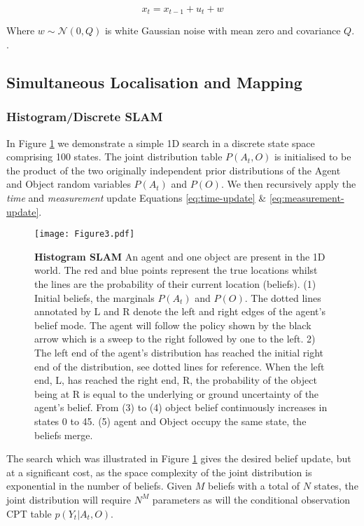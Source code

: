 \documentclass[review]{elsarticle}
\numberwithin{equation}{section}
\begin{document}
\begin{equation} \label{eq:dynamical_model}
  x_{t} = x_{t-1} + u_{t} + w \nonumber
\end{equation}

Where $w \sim \mathcal{N}(0,Q)$ is white Gaussian noise with mean zero and covariance $Q$. .

\subsection{Simultaneous Localisation and Mapping}

\subsubsection{Histogram/Discrete SLAM}\label{sec:Discrete}

In Figure \ref{fig:discrete_example} we demonstrate a simple 1D search in a discrete state space comprising 100 states. The joint
distribution table $P(A_t,O)$ is initialised to be the product of the two originally independent prior distributions of
the Agent and Object random variables $P(A_t)$ and $P(O)$. We then recursively apply the \textit{time} 
and \textit{measurement} update Equations \ref{eq:time-update} \& \ref{eq:measurement-update}.

\begin{figure}
\centering
  \texttt{[image: Figure3.pdf]}
 \caption{\textbf{Histogram SLAM} An agent and one object are present in the 1D world. The red and blue points represent the true
 locations whilst the lines are the probability of their current location (beliefs).
 (1) Initial beliefs, the marginals $P(A_t)$ and $P(O)$.
 The dotted lines annotated by L and R denote the left and right edges of the agent's belief mode. The agent will follow the policy
 shown by the black arrow which is a sweep to the right followed by one to the left.
 2) The left end of the agent's distribution has reached the initial right end of the distribution, see dotted lines for reference. When the left end, L,
 has reached the right end, R, the probability of the object being at R is equal to the underlying or ground uncertainty of the agent's belief. 
 From (3) to (4) object belief continuously increases in states 0 to 45.
 (5) agent and Object occupy the same state, the beliefs merge.}
 \label{fig:discrete_example}
\end{figure}

The search which was illustrated in Figure \ref{fig:discrete_example} gives the desired belief update, but at a significant cost, as the 
space complexity of the joint distribution is exponential in the number of beliefs. Given $M$ beliefs with
a total of $N$ states, the joint distribution will require $N^M$ parameters as will the conditional observation CPT table
$p(Y_t|A_t,O)$. 
\end{document}
